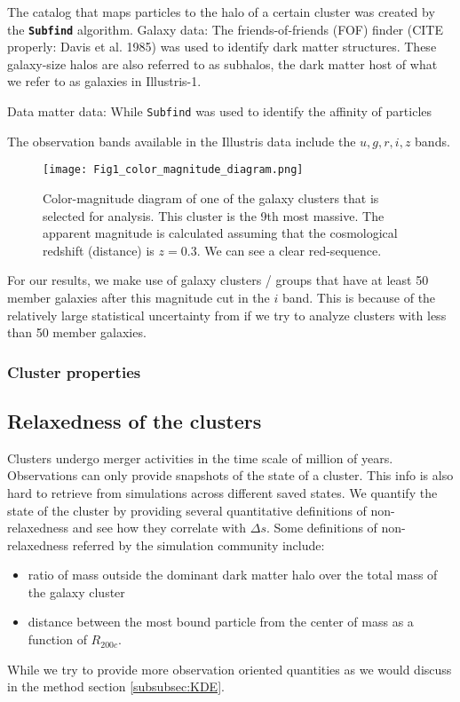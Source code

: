 The catalog that maps particles to the halo of a certain cluster was created by
the {\bf \texttt{Subfind}} algorithm.
Galaxy data: 
The friends-of-friends (FOF) finder (CITE properly: Davis et al. 1985) was used to identify
dark matter structures. These galaxy-size halos are also referred to as
subhalos, the dark matter host of what we refer to as galaxies in Illustris-1. 

Data matter data:
While \texttt{Subfind} was used to identify the affinity of particles 

The observation bands available in the Illustris data include the $u, g, r, i,
z$ bands. 

\begin{figure}
	\centering
	\texttt{[image: Fig1\_color\_magnitude\_diagram.png]}
	\caption{Color-magnitude diagram of one of the galaxy clusters that is selected for 
		analysis. This cluster is the 9th most massive. 
		The apparent magnitude is calculated assuming that 
		the cosmological redshift (distance) is $z = 0.3$. 
		We can see a clear red-sequence.
		\label{fig:color_magnitude_diagram}
	} 
\end{figure}
For our results, we make use of galaxy clusters / groups 
that have at least 50 member galaxies after this magnitude cut in the $i$ band. 
This is because of the relatively large statistical uncertainty from if we try
to analyze clusters with less than 50 member galaxies. 




\subsubsection{Cluster properties}
\label{subsubsec:cluster_properties}

\subsection{Relaxedness of the clusters}

Clusters undergo merger activities in the time scale of million of years. 
Observations can only provide snapshots of the state of a cluster. 
This info is also hard to retrieve from simulations across different saved
states.
We quantify the state of the cluster by providing several quantitative
definitions of non-relaxedness and see how they correlate with $\Delta s$.
Some definitions of non-relaxedness referred by the simulation community
include:
\begin{itemize}
	\item ratio of mass outside the dominant dark matter halo over the total mass
		of the galaxy cluster 
	\item distance between the most bound particle from the center of mass as a
		function of $R_{200c}$.
\end{itemize}
While we try to provide more observation oriented quantities as we would
discuss in the method section \ref{subsubsec:KDE}. 


